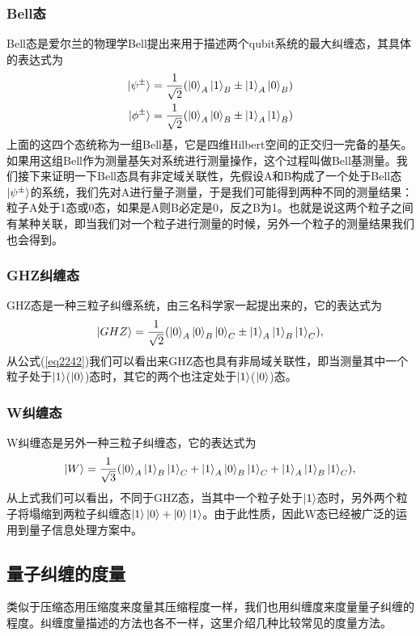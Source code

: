\subsubsection{Bell态}
Bell态是爱尔兰的物理学Bell提出来用于描述两个qubit系统的最大纠缠态，其具体的表达式为
\begin{align}\label{eq2241}
\begin{split}
\ket{\psi^{\pm}}&=\frac{1}{\sqrt{2}}(\ket{0}_A\ket{1}_B\pm\ket{1}_A\ket{0}_B)\\
\ket{\phi^{\pm}}&=\frac{1}{\sqrt{2}}(\ket{0}_A\ket{0}_B\pm\ket{1}_A\ket{1}_B)
\end{split}
\end{align}
上面的这四个态统称为一组Bell基，它是四维Hilbert空间的正交归一完备的基矢。如果用这组Bell作为测量基矢对系统进行测量操作，这个过程叫做Bell基测量。我们接下来证明一下Bell态具有非定域关联性，先假设A和B构成了一个处于Bell态$\ket{\psi^\pm}$的系统，我们先对A进行量子测量，于是我们可能得到两种不同的测量结果：粒子A处于1态或0态，如果是A则B必定是0，反之B为1。也就是说这两个粒子之间有某种关联，即当我们对一个粒子进行测量的时候，另外一个粒子的测量结果我们也会得到。
\subsubsection{GHZ纠缠态}
GHZ态是一种三粒子纠缠系统，由三名科学家一起提出来的\cite{greenberger2000similarities}，它的表达式为
\begin{align}\label{eq2242}
\ket{GHZ}=\frac{1}{\sqrt{2}}(\ket{0}_A\ket{0}_B\ket{0}_C\pm\ket{1}_A\ket{1}_B\ket{1}_C),
\end{align}
从公式(\ref{eq2242})我们可以看出来GHZ态也具有非局域关联性，即当测量其中一个粒子处于$\ket{1}$($\ket{0}$)态时，其它的两个也注定处于$\ket{1}$($\ket{0}$)态。
\subsubsection{W纠缠态}
W纠缠态是另外一种三粒子纠缠态，它的表达式为
\begin{align}\label{eq2243}
\ket{W}=\frac{1}{\sqrt{3}}(\ket{0}_A\ket{1}_B\ket{1}_C+\ket{1}_A\ket{0}_B\ket{1}_C+\ket{1}_A\ket{1}_B\ket{1}_C),
\end{align}
从上式我们可以看出，不同于GHZ态，当其中一个粒子处于$\ket{1}$态时，另外两个粒子将塌缩到两粒子纠缠态$\ket{1}\ket{0}+\ket{0}\ket{1}$。由于此性质，因此W态已经被广泛的运用到量子信息处理方案中\cite{lee2006quantum,xi2007controlled,hao2009scheme}。

\subsection{量子纠缠的度量}
类似于压缩态用压缩度来度量其压缩程度一样，我们也用纠缠度来度量量子纠缠的程度。纠缠度量描述的方法也各不一样，这里介绍几种比较常见的度量方法。
